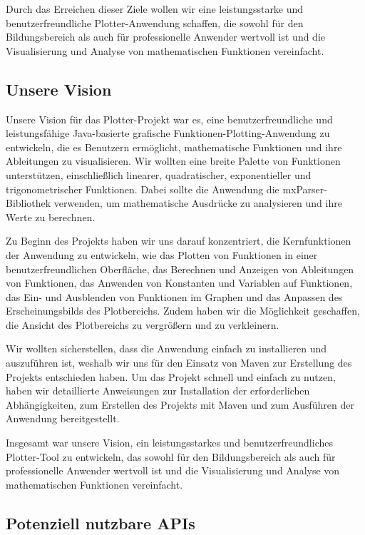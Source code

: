 \documentclass[a4paper]{article}
\begin{document}
Durch das Erreichen dieser Ziele wollen wir eine leistungsstarke und benutzerfreundliche Plotter-Anwendung schaffen, die sowohl für den Bildungsbereich als auch für professionelle Anwender wertvoll ist und die Visualisierung und Analyse von mathematischen Funktionen vereinfacht.


\subsection{Unsere Vision}
Unsere Vision für das Plotter-Projekt war es, eine benutzerfreundliche und leistungsfähige Java-basierte grafische Funktionen-Plotting-Anwendung zu entwickeln, die es Benutzern ermöglicht, mathematische Funktionen und ihre Ableitungen zu visualisieren. Wir wollten eine breite Palette von Funktionen unterstützen, einschließlich linearer, quadratischer, exponentieller und trigonometrischer Funktionen. Dabei sollte die Anwendung die mxParser-Bibliothek verwenden, um mathematische Ausdrücke zu analysieren und ihre Werte zu berechnen.

Zu Beginn des Projekts haben wir uns darauf konzentriert, die Kernfunktionen der Anwendung zu entwickeln, wie das Plotten von Funktionen in einer benutzerfreundlichen Oberfläche, das Berechnen und Anzeigen von Ableitungen von Funktionen, das Anwenden von Konstanten und Variablen auf Funktionen, das Ein- und Ausblenden von Funktionen im Graphen und das Anpassen des Erscheinungsbilds des Plotbereichs. Zudem haben wir die Möglichkeit geschaffen, die Ansicht des Plotbereichs zu vergrößern und zu verkleinern.

Wir wollten sicherstellen, dass die Anwendung einfach zu installieren und auszuführen ist, weshalb wir uns für den Einsatz von Maven zur Erstellung des Projekts entschieden haben. Um das Projekt schnell und einfach zu nutzen, haben wir detaillierte Anweisungen zur Installation der erforderlichen Abhängigkeiten, zum Erstellen des Projekts mit Maven und zum Ausführen der Anwendung bereitgestellt.

Insgesamt war unsere Vision, ein leistungsstarkes und benutzerfreundliches Plotter-Tool zu entwickeln, das sowohl für den Bildungsbereich als auch für professionelle Anwender wertvoll ist und die Visualisierung und Analyse von mathematischen Funktionen vereinfacht.

\subsection{Potenziell nutzbare APIs}
\end{document}
